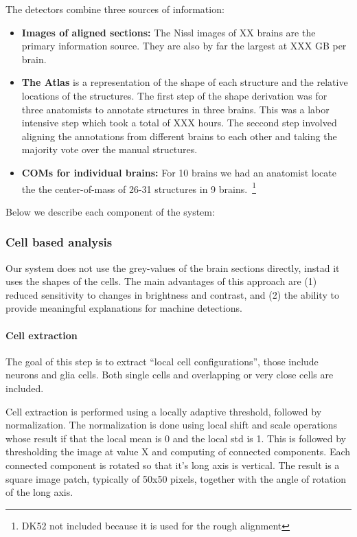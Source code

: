 \documentclass[11pt]{article}
\begin{document}
The detectors combine three sources of information:
\begin{itemize}
    \item {\bf Images of aligned sections:} The Nissl images of XX brains are the primary information source. They are also by far the largest at XXX GB per brain.
    \item {\bf The Atlas} is a representation of the shape of each
      structure and the relative locations of the structures. The
      first step of the shape derivation was for three anatomists to
      annotate structures in three brains. This was a labor intensive
      step which took a total of XXX hours. The seccond step involved
      aligning the annotations from different brains to each other and
      taking the majority vote over the manual structures.
    \item {\bf COMs for individual brains:} For 10 brains we had an
      anatomist locate the the center-of-mass of 26-31 structures in 9
      brains.~\footnote{DK52 not included because it is used for the
        rough alignment}
    \end{itemize}
   

Below we describe each component of the system:

\subsubsection{Cell based analysis}

Our system does not use the grey-values of the brain sections
directly, instad it uses the shapes of the cells. The main advantages
of this approach are (1) reduced sensitivity to changes in brightness
and contrast, and (2) the ability to provide meaningful explanations
for machine detections.

\paragraph{Cell extraction}
The goal of this step is to extract ``local cell configurations'',
those include neurons and glia cells. Both single cells and overlapping
or very close cells are included.

Cell extraction is performed using a locally adaptive threshold,
followed by normalization. The normalization is done using local
shift and scale operations whose result if that the local mean is 0
and the local std is 1. This is followed by thresholding the image at
value X and computing of connected components. Each connected
component is rotated so that it's long axis is vertical. The result
is a square image patch, typically of 50x50 pixels, together with the
angle of rotation of the long axis.
\end{document}
